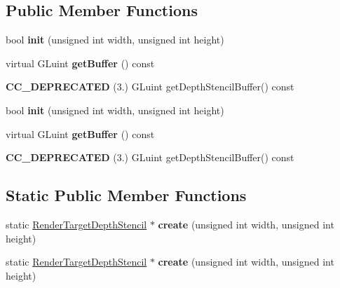 \subsection*{Public Member Functions}
\begin{DoxyCompactItemize}
\item 
\mbox{\label{classexperimental_1_1RenderTargetDepthStencil_ab87f1ba310abc5bafaa145c304165532}} 
bool {\bfseries init} (unsigned int width, unsigned int height)
\item 
\mbox{\label{classexperimental_1_1RenderTargetDepthStencil_a0bed12c0f68440506773140eedf04707}} 
virtual G\+Luint {\bfseries get\+Buffer} () const
\item 
\mbox{\label{classexperimental_1_1RenderTargetDepthStencil_a58f960f5332dd99136fd5fdf14a9dda4}} 
{\bfseries C\+C\+\_\+\+D\+E\+P\+R\+E\+C\+A\+T\+ED} (3.) G\+Luint get\+Depth\+Stencil\+Buffer() const
\item 
\mbox{\label{classexperimental_1_1RenderTargetDepthStencil_ab87f1ba310abc5bafaa145c304165532}} 
bool {\bfseries init} (unsigned int width, unsigned int height)
\item 
\mbox{\label{classexperimental_1_1RenderTargetDepthStencil_a0bed12c0f68440506773140eedf04707}} 
virtual G\+Luint {\bfseries get\+Buffer} () const
\item 
\mbox{\label{classexperimental_1_1RenderTargetDepthStencil_a58f960f5332dd99136fd5fdf14a9dda4}} 
{\bfseries C\+C\+\_\+\+D\+E\+P\+R\+E\+C\+A\+T\+ED} (3.) G\+Luint get\+Depth\+Stencil\+Buffer() const
\end{DoxyCompactItemize}
\subsection*{Static Public Member Functions}
\begin{DoxyCompactItemize}
\item 
\mbox{\label{classexperimental_1_1RenderTargetDepthStencil_a59f74358248894583d73b84cacacc488}} 
static \hyperlink{classexperimental_1_1RenderTargetDepthStencil}{Render\+Target\+Depth\+Stencil} $\ast$ {\bfseries create} (unsigned int width, unsigned int height)
\item 
\mbox{\label{classexperimental_1_1RenderTargetDepthStencil_a48838001f0115a98e8b1770206f64b01}} 
static \hyperlink{classexperimental_1_1RenderTargetDepthStencil}{Render\+Target\+Depth\+Stencil} $\ast$ {\bfseries create} (unsigned int width, unsigned int height)
\end{DoxyCompactItemize}
